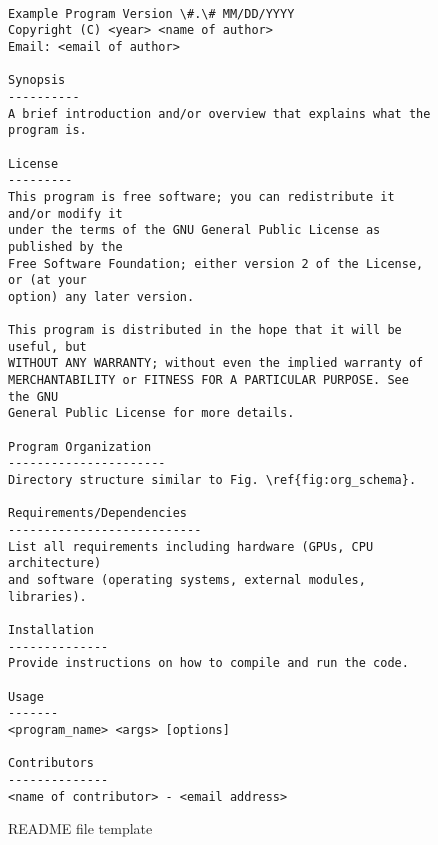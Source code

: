 \begin{figure}[htp]

\begin{vcode}
\begin{Verbatim}[frame=single,framesep=2mm,commandchars=\\\{\}]

Example Program Version \#.\# MM/DD/YYYY
Copyright (C) <year> <name of author>
Email: <email of author>

Synopsis
----------
A brief introduction and/or overview that explains what the program is.

License
---------
This program is free software; you can redistribute it and/or modify it
under the terms of the GNU General Public License as published by the
Free Software Foundation; either version 2 of the License, or (at your
option) any later version.

This program is distributed in the hope that it will be useful, but
WITHOUT ANY WARRANTY; without even the implied warranty of
MERCHANTABILITY or FITNESS FOR A PARTICULAR PURPOSE. See the GNU
General Public License for more details.

Program Organization
----------------------
Directory structure similar to Fig. \ref{fig:org_schema}.

Requirements/Dependencies
---------------------------
List all requirements including hardware (GPUs, CPU architecture)
and software (operating systems, external modules, libraries).

Installation
--------------
Provide instructions on how to compile and run the code.

Usage
-------
<program_name> <args> [options]

Contributors
--------------
<name of contributor> - <email address>

\end{Verbatim}
\end{vcode}

\caption{README file template}
\label{fig:readme_template}
\end{figure}